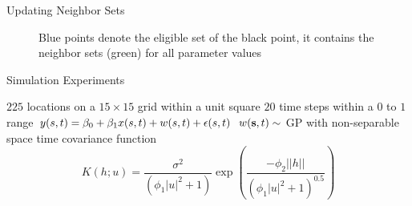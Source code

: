 \begin{frame}{Updating Neighbor Sets}
{\begin{figure}[t]
\begin{center}
 \hskip -3mm
\end{center}
\caption{Blue points denote the eligible set of the black point, it contains the neighbor sets (green) for all parameter values} 
\end{figure}
}
\end{frame}

\begin{frame}{Simulation Experiments}
\begin{itemize}
\myitem $225$ locations on a $15\times15$ grid within a unit square
\myitem $20$ time steps within a $0$ to $1$ range
\myitem $y(s,t) =\beta_0 +\beta_1 x(s,t) + w(s,t)+ \epsilon(s,t)$ 
\myitem $w(\textbf{s},t) \sim$  GP with non-separable space time covariance function \[
K(h; u) = \frac{\sigma^2}{(\phi_1|u|^2+1)}\exp\left(\frac{-\phi_2||h||}{(\phi_1|u|^2+1)^{0.5}}\right)
\]
\end{itemize}
\end{frame}

